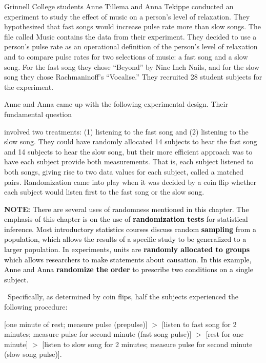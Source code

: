 \documentclass[
]{report}
\begin{document}
Grinnell College students Anne Tillema and Anna Tekippe conducted an experiment to study the effect of
music on a person's level of relaxation. They hypothesized that fast songs would increase pulse rate more
than slow songs. The file called Music contains the data from their experiment. They decided to use a person's
pulse rate as an operational definition of the person's level of relaxation and to compare pulse rates for two selections of music: a fast song and a slow song. For the fast song they chose ``Beyond'' by Nine Inch
Nails, and for the slow song they chose Rachmaninoff's ``Vocalise.'' They recruited 28 student subjects for
the experiment.

Anne and Anna came up with the following experimental design. Their fundamental question

involved two treatments: (1) listening to the fast song and (2) listening to the slow song. They could
have randomly allocated 14 subjects to hear the fast song and 14 subjects to hear the slow song, but
their more efficient approach was to have each subject provide both measurements. That is, each subject
listened to both songs, giving rise to two data values for each subject, called a matched pairs. Randomization
came into play when it was decided by a coin flip whether each subject would listen first to the
fast song or the slow song.

\large

\textbf{NOTE:}
\textcolor{black}{There are several uses of randomness mentioned in this chapter. The emphasis of this chapter is on the
use of \textbf{randomization tests} for statistical inference. Most introductory statistics courses discuss random
\textbf{sampling} from a population, which allows the results of a specific study to be generalized to a larger
population. In experiments, units are \textbf{randomly allocated to groups} which allows researchers to make
statements about causation. In this example, Anne and Anna \textbf{randomize the order} to prescribe two
conditions on a single subject.}

\normalsize

~Specifically, as determined by coin flips, half the subjects experienced the following procedure:

{[}one minute of rest; measure pulse (prepulse){]} \(>\) {[}listen to fast song for 2 minutes; measure pulse
for second minute (fast song pulse){]} \(>\) {[}rest for one minute{]} \(>\) {[}listen to slow song for 2 minutes;
measure pulse for second minute (slow song pulse){]}.
\end{document}
